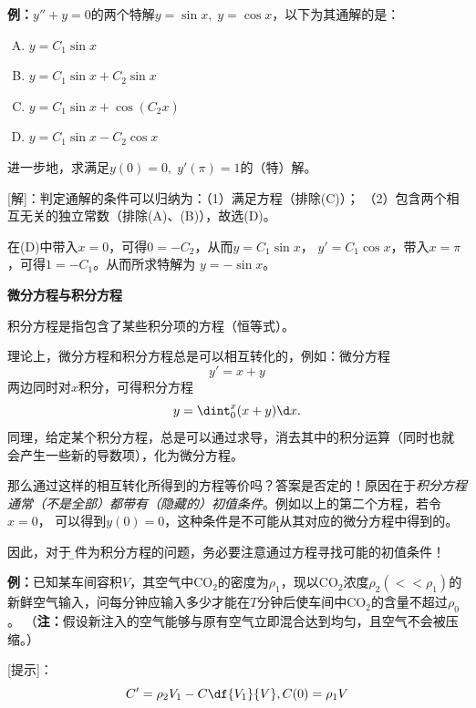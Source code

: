 {\bf 例：}$y''+y=0$的两个特解$y=\sin x,\;y=\cos x$，以下为其通解的是：
\begin{enumerate}[(A)]
  \setlength{\itemindent}{1cm}
  \item $y=C_1\sin x$
  \item $y=C_1\sin x+C_2\sin x$
  \item $y=C_1\sin x+\cos(C_2x)$
  \item $y=C_1\sin x-C_2\cos x$
\end{enumerate}
进一步地，求满足$y(0)=0,\;y'(\pi)=1$的（特）解。

[解]：判定通解的条件可以归纳为：（1）满足方程（排除(C)）；
（2）包含两个{\kaishu 相互无关}的独立常数（排除(A)、(B)），故选(D)。

在(D)中带入$x=0$，可得$0=-C_2$，从而$y=C_1\sin x$，
$y'=C_1\cos x$，带入$x=\pi$，可得$1=-C_1$。从而所求特解为
$y=-\sin x$。\fin

\begin{shaded}
	{\bf 微分方程与积分方程}
	
	积分方程是指包含了某些积分项的方程（恒等式）。
	
	理论上，微分方程和积分方程总是可以相互转化的，例如：微分方程
	$$y'=x+y$$
	两边同时对$x$积分，可得积分方程
	$$y=\dint_0^x(x+y)\d x.$$
	同理，给定某个积分方程，总是可以通过求导，消去其中的积分运算（同时也就
	会产生一些新的导数项），化为微分方程。
	
	那么通过这样的相互转化所得到的方程等价吗？答案是否定的！原因在于{\b\it 积分方程
	通常（不是全部）都带有（隐藏的）初值条件}。例如以上的第二个方程，若令$x=0$，
	可以得到$y(0)=0$，这种条件是不可能从其对应的微分方程中得到的。
	
	因此，对于{\b 条件为积分方程的问题，务必要注意通过方程寻找可能的初值条件！}
\end{shaded}

{\bf 例：}已知某车间容积$V$，其空气中CO$_2$的密度为$\rho_1$，现以CO$_2$浓度$\rho_2(<<\rho_1)$的
新鲜空气输入，问每分钟应输入多少才能在$T$分钟后使车间中CO$_2$的含量不超过$\rho_0$。
（{\bf 注：}假设新注入的空气能够与原有空气立即混合达到均匀，且空气不会被压缩。）

[提示]：$$C'=\rho_2V_1-C\df{V_1}{V},C(0)=\rho_1V$$

